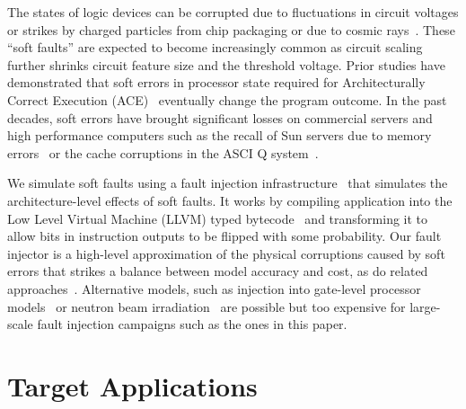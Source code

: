 \documentclass[10pt, conference, compsocconf]{IEEEtran}
\begin{document}
The states of logic devices can be corrupted due to fluctuations in circuit voltages or strikes by charged particles from chip packaging or due to cosmic rays~\cite{Ziegler:1996:TCR:226354.226356,baumann:2005}.
These ``soft faults'' are expected to become increasingly common as circuit scaling further shrinks circuit feature size and the threshold voltage.
Prior studies have demonstrated that soft errors in processor state required for Architecturally Correct Execution (ACE)~\cite{avf:2003,mpi_ser:reed:2004} eventually change the program outcome.
In the past decades, soft errors have brought significant losses on commercial servers and high performance computers such as the recall of Sun servers due to memory errors~\cite{baumann:2005} or the cache corruptions in the ASCI Q system~\cite{asciQSER:2005}.


We simulate soft faults using a fault injection infrastructure~\cite{relax:2010} that simulates the architecture-level effects of soft faults.
It works by compiling application into the Low Level Virtual Machine (LLVM) typed bytecode~\cite{LLVM} and transforming it to allow bits in instruction outputs to be flipped with some probability.
Our fault injector is a high-level approximation of the physical corruptions caused by soft errors that strikes a balance between model accuracy and cost, as do related approaches~\cite{fault_injection:iyer:1997, avf:2003}.
Alternative models, such as injection into gate-level processor models~\cite{sesee:2004} or neutron beam irradiation~\cite{freq_dep:irom:2004} are possible but too expensive for large-scale fault injection campaigns such as the ones in this paper.

\vspace{-10pt}
\section{Target Applications}
\vspace{-10pt}
\label{sec:apps}
\end{document}
